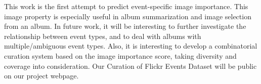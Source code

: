 \documentclass[10pt,twocolumn,letterpaper]{article}
\begin{document}
This work is the first attempt to predict event-specific image importance. This image property is especially useful in album summarization and image selection from an album. In future work, it will be interesting to further investigate the relationship between event types, and to deal with albums with multiple/ambiguous event types.  Also, it is interesting to develop a combinatorial curation system based on the image importance score, taking diversity and coverage into consideration. Our  Curation of Flickr Events Dataset will be public on our project webpage.

{\small


}
\end{document}
